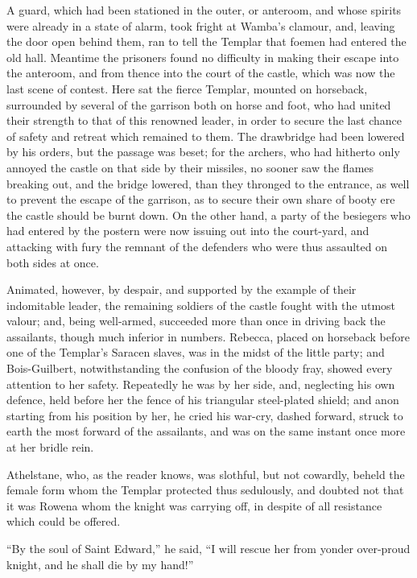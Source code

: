 A guard, which had been stationed in the outer, or anteroom, and whose
spirits were already in a state of alarm, took fright at Wamba's
clamour, and, leaving the door open behind them, ran to tell the Templar
that foemen had entered the old hall. Meantime the prisoners found no
difficulty in making their escape into the anteroom, and from thence
into the court of the castle, which was now the last scene of contest.
Here sat the fierce Templar, mounted on horseback, surrounded by several
of the garrison both on horse and foot, who had united their strength to
that of this renowned leader, in order to secure the last chance of
safety and retreat which remained to them. The drawbridge had been
lowered by his orders, but the passage was beset; for the archers, who
had hitherto only annoyed the castle on that side by their missiles, no
sooner saw the flames breaking out, and the bridge lowered, than they
thronged to the entrance, as well to prevent the escape of the garrison,
as to secure their own share of booty ere the castle should be burnt
down. On the other hand, a party of the besiegers who had entered by the
postern were now issuing out into the court-yard, and attacking with
fury the remnant of the defenders who were thus assaulted on both sides
at once.

Animated, however, by despair, and supported by the example of their
indomitable leader, the remaining soldiers of the castle fought with the
utmost valour; and, being well-armed, succeeded more than once in
driving back the assailants, though much inferior in numbers. Rebecca,
placed on horseback before one of the Templar's Saracen slaves, was in
the midst of the little party; and Bois-Guilbert, notwithstanding the
confusion of the bloody fray, showed every attention to her safety.
Repeatedly he was by her side, and, neglecting his own defence, held
before her the fence of his triangular steel-plated shield; and anon
starting from his position by her, he cried his war-cry, dashed forward,
struck to earth the most forward of the assailants, and was on the same
instant once more at her bridle rein.

Athelstane, who, as the reader knows, was slothful, but not cowardly,
beheld the female form whom the Templar protected thus sedulously, and
doubted not that it was Rowena whom the knight was carrying off, in
despite of all resistance which could be offered.

``By the soul of Saint Edward,'' he said, ``I will rescue her from
yonder over-proud knight, and he shall die by my hand!''


